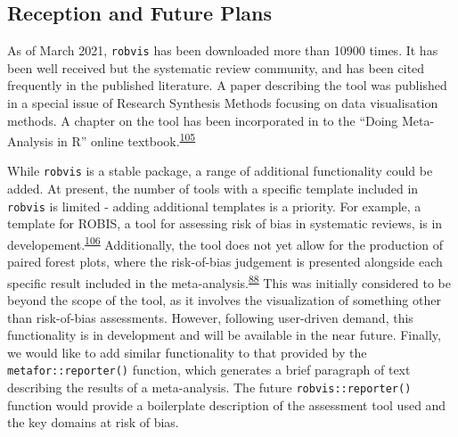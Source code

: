 \documentclass[a4paper, twoside]{templates/ociamthesis}
\newcommand*{\bibtitle}{Bibliography}
\begin{document}
\hypertarget{reception-and-future-plans-1}{%
\subsection{Reception and Future Plans}\label{reception-and-future-plans-1}}

As of March 2021, \texttt{robvis} has been downloaded more than 10900 times. It has been well received but the systematic review community, and has been cited frequently in the published literature. A paper describing the tool was published in a special issue of Research Synthesis Methods focusing on data visualisation methods. A chapter on the tool has been incorporated in to the ``Doing Meta-Analysis in R'' online textbook.\textsuperscript{\protect\hyperlink{ref-mathias_harrer_2019_2551803}{105}}

While \texttt{robvis} is a stable package, a range of additional functionality could be added. At present, the number of tools with a specific template included in \texttt{robvis} is limited - adding additional templates is a priority. For example, a template for ROBIS, a tool for assessing risk of bias in systematic reviews, is in developement.\textsuperscript{\protect\hyperlink{ref-whiting2016robis}{106}} Additionally, the tool does not yet allow for the production of paired forest plots, where the risk-of-bias judgement is presented alongside each specific result included in the meta-analysis.\textsuperscript{\protect\hyperlink{ref-cochranechpt7}{88}} This was initially considered to be beyond the scope of the tool, as it involves the visualization of something other than risk-of-bias assessments. However, following user-driven demand, this functionality is in development and will be available in the near future. Finally, we would like to add similar functionality to that provided by the \texttt{metafor::reporter()} function, which generates a brief paragraph of text describing the results of a meta-analysis. The future \texttt{robvis::reporter()} function would provide a boilerplate description of the assessment tool used and the key domains at risk of bias.


\setlength{\baselineskip}{0pt} %

{\renewcommand*\MakeUppercase[1]{#1}%
\printbibliography[heading=bibintoc,title={\bibtitle}]}
\end{document}
